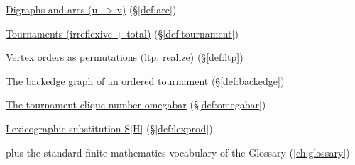 \begin{closurepanel}
\item \hyperref[def:arc]{Digraphs and arcs (u --> v)} (\S\ref*{def:arc})
\item \hyperref[def:tournament]{Tournaments (irreflexive + total)} (\S\ref*{def:tournament})
\item \hyperref[def:ltp]{Vertex orders as permutations (ltp, realize)} (\S\ref*{def:ltp})
\item \hyperref[def:backedge]{The backedge graph of an ordered tournament} (\S\ref*{def:backedge})
\item \hyperref[def:omegabar]{The tournament clique number omegabar} (\S\ref*{def:omegabar})
\item \hyperref[def:lexprod]{Lexicographic substitution S[H]} (\S\ref*{def:lexprod})
\item plus the standard finite-mathematics vocabulary of the Glossary (\cref{ch:glossary})
\end{closurepanel}
